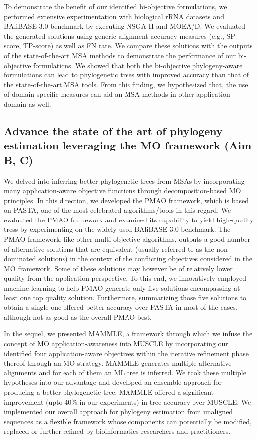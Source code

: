 To demonstrate the benefit of our identified bi-objective formulations, we performed extensive experimentation with biological rRNA datasets and BAliBASE 3.0 benchmark by executing NSGA-II and MOEA/D. We evaluated the generated solutions using generic alignment accuracy measures (e.g., SP-score, TP-score) as well as FN rate. We compare these solutions with the outputs of the state-of-the-art MSA methods to demonstrate the performance of our bi-objective formulations. We showed that both the bi-objective phylogeny-aware formulations can lead to phylogenetic trees with improved accuracy than that of the state-of-the-art MSA tools. From this finding, we hypothesized that, the use of domain specific measures can aid an MSA methods in other application domain as well.

\subsection{Advance the state of the art of phylogeny estimation leveraging the MO framework (Aim B, C)}
We delved into inferring better phylogenetic trees from MSAs by incorporating many application-aware objective functions through decomposition-based MO principles. In this direction, we developed the PMAO framework, which is based on PASTA, one of the most celebrated algorithms/tools in this regard. We evaluated the PMAO framework and examined its capability to yield high-quality tress by experimenting on the widely-used BAliBASE 3.0 benchmark. The PMAO framework, like other multi-objective algorithms, outputs a good number of alternative solutions that are equivalent (usually referred to as the non-dominated solutions) in the context of the conflicting objectives considered in the MO framework. Some of these solutions may however be of relatively lower quality from the application perspective. To this end, we innovatively employed machine learning to help PMAO generate only five solutions encompassing at least one top quality solution. Furthermore, summarizing those five solutions to obtain a single one offered better accuracy over PASTA in most of the cases, although not as good as the overall PMAO best.

In the sequel, we presented MAMMLE, a framework through which we infuse the concept of MO application-awareness into MUSCLE by incorporating our identified four application-aware objectives within the iterative refinement phase thereof through an MO strategy. MAMMLE generates multiple alternative alignments and for each of them an ML tree is inferred. We took these multiple hypotheses into our advantage and developed an ensemble approach for producing a better phylogenetic tree. MAMMLE offered a significant improvement (upto 40\% in our experiments) in tree accuracy over MUSCLE. We implemented our overall approach for phylogeny estimation from unaligned sequences as a flexible framework whose components can potentially be modified, replaced or further refined by bioinformatics researchers and practitioners.

